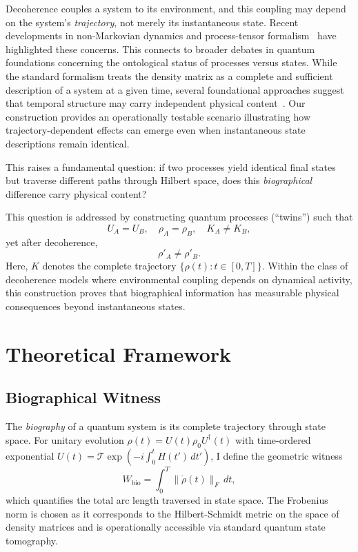 \documentclass[12pt,a4paper]{article}
\begin{document}
Decoherence couples a system to its environment, and this coupling may
depend on the system's \emph{trajectory}, not merely its instantaneous
state. Recent developments in non-Markovian dynamics and process-tensor
formalism~\citep{pollock2018nonmarkovian,milz2021quantum} have highlighted
these concerns. This connects to broader debates in quantum foundations
concerning the ontological status of processes versus states. While the
standard formalism treats the density matrix as a complete and sufficient
description of a system at a given time, several foundational approaches
suggest that temporal structure may carry independent physical
content~\citep{chiribella2008quantum}. Our construction provides an
operationally testable scenario illustrating how trajectory-dependent
effects can emerge even when instantaneous state descriptions remain
identical.

This raises a fundamental question: if two processes yield identical final
states but traverse different paths through Hilbert space, does this
\emph{biographical} difference carry physical content?

This question is addressed by constructing quantum processes (``twins'') such
that
\begin{equation}
  U_A = U_B,\quad \rho_A = \rho_B,\quad K_A \neq K_B,
  \label{eq:twins_condition}
\end{equation}
yet after decoherence,
\begin{equation}
  \rho'_A \neq \rho'_B.
  \label{eq:divergence}
\end{equation}
Here, $K$ denotes the complete trajectory $\{\rho(t): t\in[0,T]\}$.
Within the class of decoherence models where environmental coupling
depends on dynamical activity, this construction proves that biographical
information has measurable physical consequences beyond instantaneous
states.

\section{Theoretical Framework}

\subsection{Biographical Witness}

The \emph{biography} of a quantum system is its complete trajectory
through state space. For unitary evolution
$\rho(t) = U(t)\rho_0 U^\dagger(t)$ with time-ordered exponential
$U(t) = \mathcal{T}\exp(-i\int_0^t H(t')\,dt')$, I define the geometric
witness
\begin{equation}
  W_{\mathrm{bio}} = \int_0^T \|\dot{\rho}(t)\|_F\,dt,
  \label{eq:witness}
\end{equation}
which quantifies the total arc length traversed in state space.
The Frobenius norm is chosen as it corresponds to the Hilbert-Schmidt
metric on the space of density matrices and is operationally accessible
via standard quantum state tomography.
\end{document}
